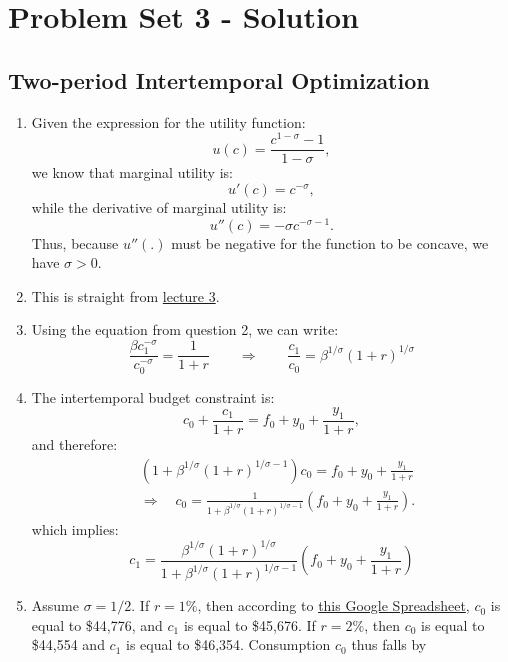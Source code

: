 \documentclass[]{book}
\theoremstyle{definition}
\theoremstyle{definition}
\theoremstyle{definition}
\theoremstyle{remark}
\begin{document}
\chapter*{Problem Set 3 - Solution}\label{problem-set-3---solution}

\section*{Two-period Intertemporal
Optimization}\label{two-period-intertemporal-optimization-1}

\begin{enumerate}
\def\labelenumi{\arabic{enumi}.}
\item
  Given the expression for the utility function:
  \[u(c) = \frac{c^{1-\sigma}-1}{1-\sigma},\] we know that marginal
  utility is: \[u'(c)=c^{-\sigma},\] while the derivative of marginal
  utility is: \[u''(c)=-\sigma c^{-\sigma-1}.\] Thus, because \(u''(.)\)
  must be negative for the function to be concave, we have \(\sigma>0\).
\item
  This is straight from \protect\hyperlink{two-period}{lecture 3}.
\item
  Using the equation from question 2, we can write:
  \[\frac{\beta c_1^{-\sigma}}{c_0^{-\sigma}}=\frac{1}{1+r} \qquad \Rightarrow \qquad \frac{c_1}{c_0}=\beta^{1/\sigma} (1+r)^{1/\sigma}\]
\item
  The intertemporal budget constraint is:
  \[c_0 + \frac{c_1}{1+r} = f_0 + y_0 + \frac{y_1}{1+r},\] and
  therefore: \[\begin{aligned}
  & \left(1 + \beta^{1/\sigma}(1+r)^{1/\sigma-1} \right)c_0 = f_0 + y_0 + \frac{y_1}{1+r} \\
  & \Rightarrow \quad c_0 = \frac{1}{1 + \beta^{1/\sigma}(1+r)^{1/\sigma-1}} \left( f_0 + y_0 + \frac{y_1}{1+r}\right).
  \end{aligned}\] which implies:
  \[c_1 = \frac{\beta^{1/\sigma}(1+r)^{1/\sigma}}{1 + \beta^{1/\sigma}(1+r)^{1/\sigma-1}} \left( f_0 + y_0 + \frac{y_1}{1+r}\right)\]
\item
  Assume \(\sigma = 1/2\). If \(r = 1\%\), then according to
  \href{https://docs.google.com/spreadsheets/d/1dDFa5YZE5170Tv36klHQ19ykK2bP9wjeR0Y1_h-kacg/edit?usp=sharing}{this
  Google Spreadsheet}, \(c_0\) is equal to \$44,776, and \(c_1\) is
  equal to \$45,676. If \(r = 2\%\), then \(c_0\) is equal to \$44,554
  and \(c_1\) is equal to \$46,354. Consumption \(c_0\) thus falls by

\end{enumerate}
\end{document}
